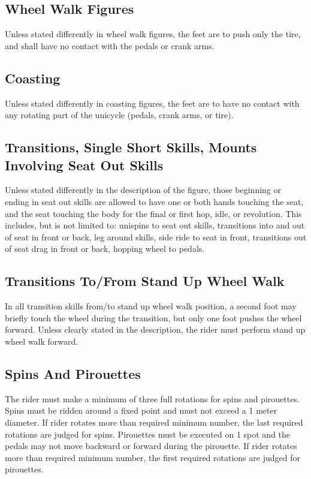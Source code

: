 \subsection{Wheel Walk Figures}
Unless stated differently in wheel walk figures, the feet are to push only the tire, and shall have no contact with the pedals or crank arms.

\subsection{Coasting}
Unless stated differently in coasting figures, the feet are to have no contact with any rotating part of the unicycle (pedals, crank arms, or tire).

\subsection{Transitions, Single Short Skills, Mounts Involving Seat Out Skills}
Unless stated differently in the description of the figure, those beginning or ending in seat out skills are allowed to have one or both hands touching the seat, and the seat touching the body for the final or first hop, idle, or revolution.
This includes, but is not limited to: unispins to seat out skills, transitions into and out of seat in front or back, leg around skills, side ride to seat in front, transitions out of seat drag in front or back, hopping wheel to pedals.

\subsection{Transitions To/From Stand Up Wheel Walk}
In all transition skills from/to stand up wheel walk position, a second foot may briefly touch the wheel during the transition, but only one foot pushes the wheel forward.
Unless clearly stated in the description, the rider must perform stand up wheel walk forward.

\subsection{Spins And Pirouettes}
The rider must make a minimum of three full rotations for spins and pirouettes.
Spins must be ridden around a fixed point and must not exceed a 1 meter diameter.
If rider rotates more than required minimum number, the last required rotations are judged for spins.
Pirouettes must be executed on 1 spot and the pedals may not move backward or forward during the pirouette.
If rider rotates more than required minimum number, the first required rotations are judged for pirouettes.

